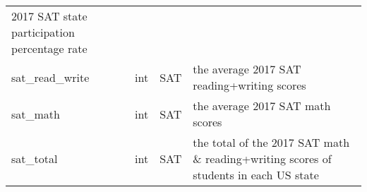 \documentclass[11pt]{article}
\begin{document}
\begin{longtable}[]{@{}llll@{}}
\begin{minipage}[t]{0.05\columnwidth}
2017 SAT state participation percentage rate\strut
\end{minipage}\tabularnewline
\begin{minipage}[t]{0.05\columnwidth}\raggedright\strut
sat\_read\_write\strut
\end{minipage} & \begin{minipage}[t]{0.05\columnwidth}\raggedright\strut
int\strut
\end{minipage} & \begin{minipage}[t]{0.05\columnwidth}\raggedright\strut
SAT\strut
\end{minipage} & \begin{minipage}[t]{0.05\columnwidth}\raggedright\strut
the average 2017 SAT reading+writing scores\strut
\end{minipage}\tabularnewline
\begin{minipage}[t]{0.05\columnwidth}\raggedright\strut
sat\_math\strut
\end{minipage} & \begin{minipage}[t]{0.05\columnwidth}\raggedright\strut
int\strut
\end{minipage} & \begin{minipage}[t]{0.05\columnwidth}\raggedright\strut
SAT\strut
\end{minipage} & \begin{minipage}[t]{0.05\columnwidth}\raggedright\strut
the average 2017 SAT math scores\strut
\end{minipage}\tabularnewline
\begin{minipage}[t]{0.05\columnwidth}\raggedright\strut
sat\_total\strut
\end{minipage} & \begin{minipage}[t]{0.05\columnwidth}\raggedright\strut
int\strut
\end{minipage} & \begin{minipage}[t]{0.05\columnwidth}\raggedright\strut
SAT\strut
\end{minipage} & \begin{minipage}[t]{0.05\columnwidth}\raggedright\strut
the total of the 2017 SAT math \& reading+writing scores of students in
each US state\strut
\end{minipage}\tabularnewline
\bottomrule
\end{longtable}
\end{document}
